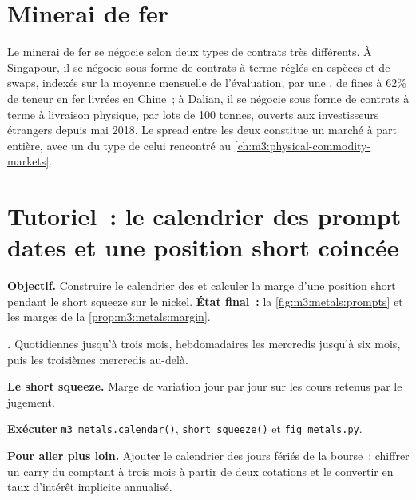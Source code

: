 \section{Minerai de fer}

Le minerai de fer se négocie selon deux types de contrats très différents. À Singapour, il se négocie sous forme de contrats à terme réglés en espèces et de swaps, indexés sur la moyenne mensuelle
de l'évaluation, par une , de fines à 62\% de teneur en fer livrées en Chine~; à Dalian,
il se négocie sous forme de contrats à terme à livraison physique, par lots de 100 tonnes, ouverts aux investisseurs étrangers depuis
mai 2018. Le spread entre les deux constitue un marché à part entière, avec un  du type de celui
rencontré au \cref{ch:m3:physical-commodity-markets}.

\section{Tutoriel~: le calendrier des prompt dates et une position short coincée}\label{tut:m3:metals:prompts}

\begin{tutorial}
\textbf{Objectif.} Construire le calendrier des  et calculer la marge d'une position short pendant le
short squeeze sur le nickel. \textbf{État final~:} la \cref{fig:m3:metals:prompts} et les marges de la
\cref{prop:m3:metals:margin}.
\begin{tutsteps}
\item \textbf{.} Quotidiennes jusqu'à trois mois, hebdomadaires les mercredis jusqu'à six mois, puis les troisièmes
mercredis au-delà.
\label{lst:m3:metals:prompts}
\item \textbf{Le short squeeze.} Marge de variation jour par jour sur les cours retenus par le jugement.
\label{lst:m3:metals:squeeze}
\item \textbf{Exécuter} \texttt{m3\_metals.calendar()}, \texttt{short\_squeeze()} et \texttt{fig\_metals.py}.
\end{tutsteps}
\textbf{Pour aller plus loin.} Ajouter le calendrier des jours fériés de la bourse~; chiffrer un carry du comptant à trois
mois à partir de deux cotations et le convertir en taux d'intérêt implicite annualisé.
\end{tutorial}

